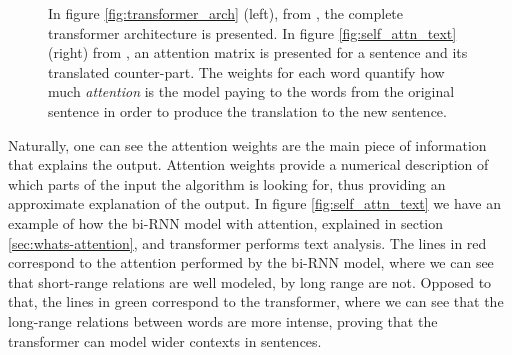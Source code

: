 \begin{figure}[!h] 
	\centering
	\hfill%
	\caption{In figure \ref{fig:transformer_arch} (left), from \cite{vaswani2023attention}, the complete transformer architecture is presented. In figure \ref{fig:self_attn_text} (right) from \cite{translationmin2023attention}, an attention matrix is presented for a sentence and its translated counter-part. The weights for each word quantify how much \textit{attention} is the model paying to the words from the original sentence in order to produce the translation to the new sentence.}
\end{figure}


Naturally, one can see the attention weights are the main piece of information that explains the output. Attention weights provide a numerical description of which parts of the input the algorithm is looking for, thus providing an approximate explanation of the output. In figure \ref{fig:self_attn_text} we have an example of how the bi-RNN model with attention, explained in section \ref{sec:whats-attention}, and transformer performs text analysis. The lines in red correspond to the attention performed by the bi-RNN model, where we can see that short-range relations are well modeled, by long range are not. Opposed to that, the lines in green correspond to the transformer, where we can see that the long-range relations between words are more intense, proving that the transformer can model wider contexts in sentences.

